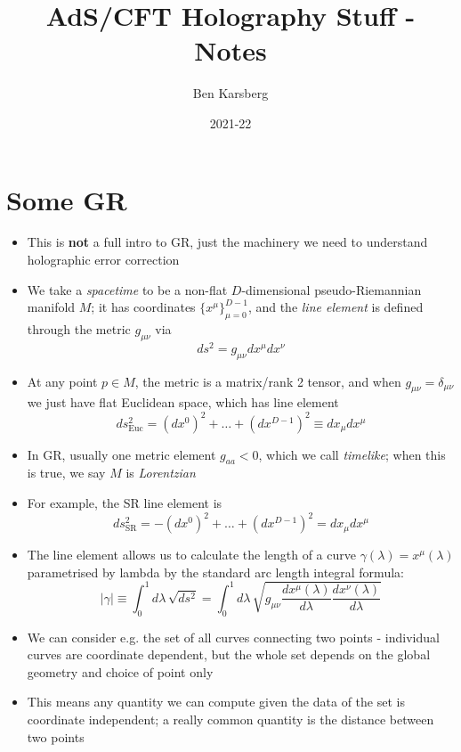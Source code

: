 \documentclass[12pt,a4paper]{article}
\title{AdS/CFT Holography Stuff - Notes}
\author{Ben Karsberg}
\date{2021-22}
\numberwithin{equation}{section}
\begin{document}
	\maketitle
	\section{Some GR}
	\begin{itemize}
		\item This is \textbf{not} a full intro to GR, just the machinery we need to understand holographic error correction
		\item We take a \textit{spacetime} to be a non-flat $D$-dimensional pseudo-Riemannian manifold $M$; it has coordinates $\{x^{\mu}\}_{\mu=0}^{D-1}$, and the \textit{line element} is defined through the metric $g_{\mu\nu}$ via
		\begin{equation}
			ds^{2}=g_{\mu\nu}dx^{\mu}dx^{\nu}
		\end{equation}
		\item At any point $p\in M$, the metric is a matrix/rank 2 tensor, and when $g_{\mu\nu}=\delta_{\mu\nu}$ we just have flat Euclidean space, which has line element
		$$
			ds^{2}_{\text{Euc}}=(dx^{0})^{2}+\ldots+(dx^{D-1})^{2}\equiv dx_{\mu}dx^{\mu}
		$$
		\item In GR, usually one metric element $g_{aa}<0$, which we call \textit{timelike}; when this is true, we say $M$ is \textit{Lorentzian}
		\item For example, the SR line element is
		\begin{equation}
			ds^{2}_{\text{SR}}=-(dx^{0})^{2}+\ldots+(dx^{D-1})^{2}=dx_{\mu}dx^{\mu}
		\end{equation}
		\item The line element allows us to calculate the length of a curve $\gamma(\lambda)=x^{\mu}(\lambda)$ parametrised by lambda by the standard arc length integral formula:
		\begin{equation}
			|\gamma|\equiv\int_{0}^{1}d\lambda\,\sqrt{ds^{2}}=\int_{0}^{1}d\lambda\,\sqrt{g_{\mu\nu}\frac{dx^{\mu}(\lambda)}{d\lambda}\frac{dx^{\nu}(\lambda)}{d\lambda}}
		\end{equation}
		\item We can consider e.g. the set of all curves connecting two points - individual curves are coordinate dependent, but the whole set depends on the global geometry and choice of point only
		\item This means any quantity we can compute given the data of the set is coordinate independent; a really common quantity is the distance between two points

\end{itemize}
\end{document}
